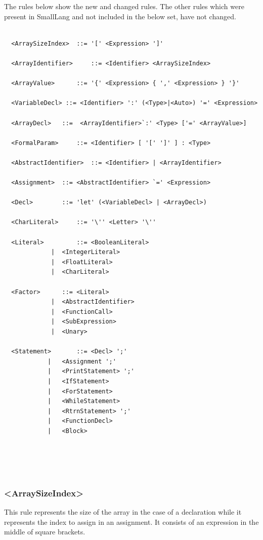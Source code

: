 \documentclass{article}
\begin{document}
				The rules below show the new and changed rules. The other rules which were present in SmallLang and not included in the below set, have not changed.
				
				\begin{lstlisting}[backgroundcolor=\color{lightgray},basicstyle=\small,upquote=true]
				
  <ArraySizeIndex> 	::= '[' <Expression> ']'
  
  <ArrayIdentifier> 	::= <Identifier> <ArraySizeIndex>
  
  <ArrayValue> 		::= '{' <Expression> { ',' <Expression> } '}'
  
  <VariableDecl> ::= <Identifier> ':' (<Type>|<Auto>) '=' <Expression> 
  
  <ArrayDecl> 	::=  <ArrayIdentifier>`:' <Type> ['=' <ArrayValue>] 
  
  <FormalParam> 	::= <Identifier> [ '[' ']' ] : <Type>
  
  <AbstractIdentifier>	::= <Identifier> | <ArrayIdentifier>
  
  <Assignment>	::= <AbstractIdentifier> `=' <Expression>
  
  <Decl> 		::= 'let' (<VariableDecl> | <ArrayDecl>)
  
  <CharLiteral>  	::= '\'' <Letter> '\''
  
  <Literal> 		::= <BooleanLiteral>
  			 |  <IntegerLiteral>
  			 |  <FloatLiteral>
  			 |  <CharLiteral>
  					
  <Factor> 		::= <Literal>
  			 |  <AbstractIdentifier>
  			 |  <FunctionCall>
  			 |  <SubExpression>
  			 |  <Unary>
  
  <Statement> 		::= <Decl> ';'
  			|   <Assignment ';'
  			|   <PrintStatement> ';'
  			|   <IfStatement> 
  			|   <ForStatement> 
  			|   <WhileStatement> 
  			|   <RtrnStatement> ';'
  			|   <FunctionDecl>
  			|   <Block>
  
  
  	
				  
				\end{lstlisting}
				
				
				\subsubsection{\textless ArraySizeIndex\textgreater}
				
				This rule represents the size of the array in the case of a declaration while it represents the index to assign in an assignment. It consists of an expression in the middle of square brackets.
				
\end{document}
